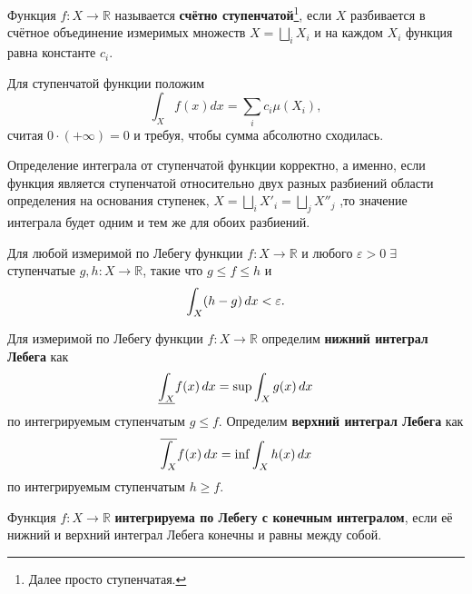 
\begin{to_def}
    Функция $f \colon X \to \mathbb{R}$ называется \textbf{счётно ступенчатой}\footnote{
        Далее просто ступенчатая.
    }, если $X$ разбивается в счётное объединение измеримых множеств $X = \bigsqcup_i X_i$ и на каждом $X_i$ функция равна константе $c_i$.
\end{to_def}


\begin{to_def}
    Для ступенчатой функции положим
    $$
    \int_X f(x) dx = \sum_i c_i \mu(X_i),
    $$
    считая $0 \cdot (+\infty) = 0$ и требуя, чтобы сумма абсолютно сходилась.
\end{to_def}

\begin{to_lem}
    Определение интеграла от ступенчатой функции корректно, а именно, если
функция является ступенчатой относительно двух разных разбиений области определения
на основания ступенек, $X = \bigsqcup_i X'_i = \bigsqcup_j X''_j$ ,то значение интеграла будет одним и тем же для обоих разбиений.
\label{5.58}
\end{to_lem}

\begin{to_lem}
    Для любой измеримой по Лебегу функции $f \colon X \to \mathbb{R}$ и любого $\varepsilon > 0 \; \exists$ ступенчатые $g, h \colon X \to \mathbb{R}$, такие что $g \leq f \leq h$ и 
    $$
    \int_X (h - g) \, d x < \varepsilon.
    $$
    \label{5.59}
\end{to_lem}


\begin{to_def}
    Для измеримой по Лебегу функции $f \colon X \to \mathbb{R}$ определим \textbf{нижний интеграл Лебега} как
    $$
    \underline{\int_X} f(x) \, d x = \sup \int_X g(x) \, d x
    $$
    по интегрируемым ступенчатым $g \leq f$. Определим \textbf{верхний интеграл Лебега} как 
    $$
    \overline{\int_X} f(x) \, d x = \inf \int_X h(x) \, d x
    $$
    по интегрируемым ступенчатым $h \geq f$.
\end{to_def}

\begin{to_def}
    Функция $f \colon X \to \mathbb{R}$ \textbf{интегрируема по Лебегу с конечным интегралом}, если её нижний и верхний интеграл Лебега конечны и равны между собой.
\end{to_def}

